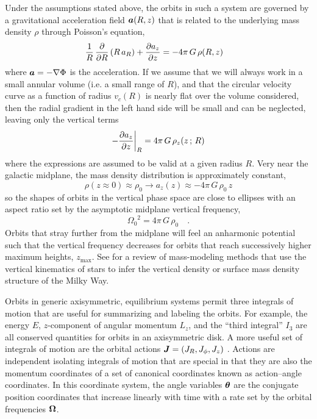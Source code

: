 \documentclass[modern]{aastex631}
\newcommand{\freqzero}{\ensuremath{\Omega_0}}
\begin{document}
Under the assumptions stated above, the orbits in such a system are governed by a
gravitational acceleration field $\boldsymbol{a}(R, z)$ that is related to the underlying mass
density $\rho$ through Poisson's equation,
\begin{align}
    \frac{1}{R} \, \frac{\partial {}}{\partial {R}}\left(R \, a_R\right) + \frac{\partial {a_z}}{\partial {z}}
        &= - 4\pi \, G \, \rho(R, z)
\end{align}
where $\boldsymbol{a} = -\nabla \Phi$ is the acceleration.
If we assume that we will always work in a small annular volume (i.e. a small range of
$R$), and that the circular velocity curve as a function of radius $v_c(R)$ is nearly
flat over the volume considered, then the radial gradient in the left hand side will be
small and can be neglected, leaving only the vertical terms
\begin{equation}
    -\frac{\partial {a_z}}{\partial {z}}\biggr\rvert_R = 4\pi \, G \, \rho_z(z \,;\, R)
\end{equation}
where the expressions are assumed to be valid at a given radius $R$.
Very near the galactic midplane, the mass density distribution is approximately
constant,
\begin{equation}
    \rho(z\approx 0) \approx \rho_0
        \rightarrow a_z(z) \approx -4\pi \, G \, \rho_0 \, z
\end{equation}
so the shapes of orbits in the vertical phase space are close to ellipses with an aspect
ratio set by the asymptotic midplane vertical frequency,
\begin{equation}
    \freqzero^2 = 4\pi\,G \, \rho_0 \quad . \label{eq:freqzero}
\end{equation}
Orbits that stray further from the midplane will feel an anharmonic potential such that
the vertical frequency decreases for orbits that reach successively higher maximum
heights, $z_{\textrm{max}}$.
See \citet{Read:2014} for a review of mass-modeling methods that use the vertical
kinematics of stars to infer the vertical density or surface mass density structure of
the Milky Way.

Orbits in generic axisymmetric, equilibrium systems permit three integrals of motion
that are useful for summarizing and labeling the orbits.
For example, the energy $E$, $z$-component of angular momentum $L_z$, and the ``third
integral'' $I_3$ are all conserved quantities for orbits in an axisymmetric disk.
A more useful set of integrals of motion are the orbital actions $\boldsymbol{J} = (J_R,
J_\phi, J_z)$ \citep{Binney:2008}.
Actions are independent isolating integrals of motion that are special in that they are
also the momentum coordinates of a set of canonical coordinates known as action--angle
coordinates.
In this coordinate system, the angle variables $\boldsymbol{\theta}$ are the conjugate position
coordinates that increase linearly with time with a rate set by the orbital frequencies
$\boldsymbol{\Omega}$.
\end{document}
